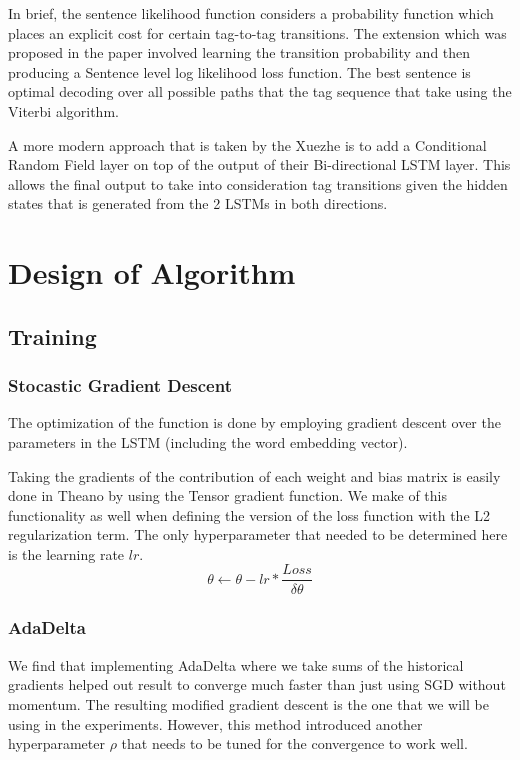 \documentclass[fyp]{socreport}
\begin{document}
In brief, the sentence likelihood function considers a probability function
which places an explicit cost for certain tag-to-tag transitions. The extension
which was proposed in the paper involved learning the transition probability
and then producing a Sentence level log likelihood loss function. The best
sentence is optimal decoding over all possible paths that the tag sequence that
take using the Viterbi algorithm.

A more modern approach that is taken by the Xuezhe \cite{2016arXiv160301354M}
is to add a Conditional Random Field layer on top of the output of their
Bi-directional LSTM layer. This allows the final output to take into
consideration tag transitions given the hidden states that is
generated from the 2 LSTMs in both directions.


\section{Design of Algorithm}

\subsection{Training}

\subsubsection{Stocastic Gradient Descent} The optimization of the function is
done by employing gradient descent over the parameters in the LSTM (including
the word embedding vector).

Taking the gradients of the contribution of each weight and bias matrix is
easily done in Theano by using the Tensor gradient function. We make of this
functionality as well when defining the version of the loss function with the
L2 regularization term. The only hyperparameter that needed to be determined
here is the learning rate $lr$.
\begin{equation}
  \theta \leftarrow \theta - lr * \frac{Loss}{\delta \theta}
\end{equation}

\subsubsection{AdaDelta} We find that implementing AdaDelta where we take sums
of the historical gradients helped out result to converge much faster than just
using SGD without momentum. The resulting modified gradient descent is the one
that we will be using in the experiments. However, this method introduced another
hyperparameter $\rho$ that needs to be tuned for the convergence to work well.
\end{document}
